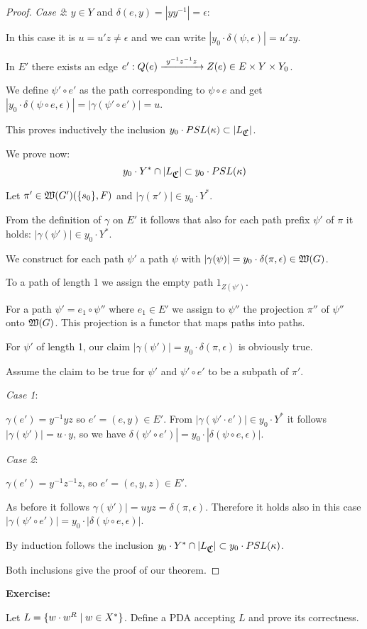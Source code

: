 \begin{proof}
{\em Case 2}: $y \in Y$ and $\delta(e, y) = |y y^{-1}| = \epsilon$:

In this case it is $u = u' z \neq \epsilon$ and we can write $|y_0 \cdot
\delta(\psi, \epsilon)| = u'zy$.

In $E'$ there exists an edge $e' : Q(e) \xrightarrow{\ {y^{-1}z^{-1}z}\ } Z(e) \in E
\times Y \times Y_0$.

We define $\psi' \circ e'$ as the path corresponding to $\psi \circ e$ and get
$|y_0 \cdot \delta(\psi \circ e, \epsilon)| = |\gamma(\psi' \circ e')| = u$.

This proves inductively the inclusion $y_0 \cdot PSL(\kappa) \subset
|L_{\mbox{$\mathfrak{C}$}}|$.


We prove now:
\[ y_0 \cdot Y^* \cap |L_{\mbox{$\mathfrak{C}$}}| \subset y_0 \cdot PSL(\kappa) \]

Let $\pi' \in \mbox{$\mathfrak{W}({G'})$}(\mbox{$\{s_0\}$}, F)$ and $|\gamma(\pi')| \in y_0 \cdot
Y^*$.

From the definition of $\gamma$ on $E'$ it follows that also for each path
prefix $\psi'$ of $\pi$ it holds: $|\gamma(\psi')| \in y_0 \cdot Y^*$.

We construct for each path $\psi'$ a path $\psi$ with $|\gamma(\psi)| = y_0
\cdot \delta(\pi, \epsilon) \in \mbox{$\mathfrak{W}({G})$}$.

To a path of length 1 we assign the empty path $1_{Z(\psi')}$.

For a path $\psi' = e_1 \circ \psi''$ where $e_1 \in E'$ we assign to $\psi''$
the projection $\pi''$ of $\psi''$ onto $\mbox{$\mathfrak{W}({G})$}$. This projection is a
functor that maps paths into paths.

For $\psi'$ of length 1, our claim $|\gamma(\psi')| = y_0 \cdot \delta(\pi,
\epsilon)$ is obviously true.

Assume the claim to be true for $\psi'$ and $\psi' \circ e'$ to be a subpath of
$\pi'$.

{\em Case 1}:

$\gamma(e') = y^{-1}yz$ so $e' = (e, y) \in E'$. From $|\gamma(\psi' \cdot
e')| \in y_0 \cdot Y^*$ it follows $|\gamma(\psi')| = u \cdot y$, so we have
$\delta(\psi' \circ e')| = y_0 \cdot |\delta(\psi \circ e, \epsilon)|$.

{\em Case 2}:

$\gamma(e') = y^{-1} z^{-1} z$, so $e' = (e, y, z) \in E'$.

As before it follows $\gamma(\psi')| = uyz = \delta(\pi, \epsilon)$. Therefore
it holds also in this case $|\gamma(\psi' \circ e')| = y_0 \cdot |\delta(\psi
\circ e, \epsilon)|$.

By induction follows the inclusion $y_0 \cdot Y^* \cap |L_{\mbox{$\mathfrak{C}$}}| \subset y_0
\cdot PSL(\kappa)$.

Both inclusions give the proof of our theorem.
\end{proof}

{\bf Exercise:}

Let $L = \mbox{$\{ w \cdot w^R \mid w \in X^*\}$}$. Define a PDA accepting $L$ and
prove its correctness.
